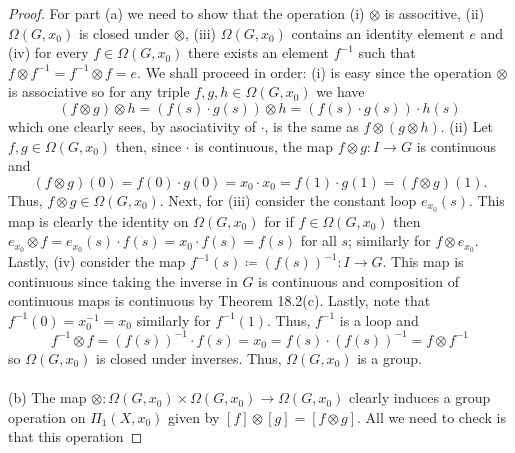 \begin{proof}
For part (a) we need to show that the operation (i) $\otimes$ is
associtive, (ii) $\Omega(G,x_0)$ is closed under $\otimes$, (iii)
$\Omega(G,x_0)$ contains an identity element $e$ and (iv) for every
$f\in\Omega(G,x_0)$ there exists an element $f^{-1}$ such that $f\otimes
f^{-1}=f^{-1}\otimes f=e$. We shall proceed in order: (i) is easy since
the operation $\otimes$ is associative so for any triple
$f,g,h\in\Omega(G,x_0)$ we have
\[
(f\otimes g)\otimes h=(f(s)\cdot g(s))\otimes h=(f(s)\cdot g(s))\cdot h(s)
\]
which one clearly sees, by asociativity of $\cdot$, is the same as
$f\otimes(g\otimes h)$. (ii) Let $f,g\in\Omega(G,x_0)$ then, since $\cdot$
is continuous, the map $f\otimes g\colon I\to G$ is continuous and
\[
(f\otimes g)(0)=f(0)\cdot g(0)=x_0\cdot x_0=f(1)\cdot g(1)
=(f\otimes g)(1).
\]
Thus, $f\otimes g\in\Omega(G,x_0)$. Next, for (iii) consider the constant
loop $e_{x_0}(s)$. This map is clearly the identity on $\Omega(G,x_0)$ for
if $f\in\Omega(G,x_0)$ then $e_{x_0}\otimes f=e_{x_0}(s)\cdot f(s)=x_0\cdot
f(s)=f(s)$ for all $s$; similarly for $f\otimes e_{x_0}$. Lastly, (iv)
consider the map $f^{-1}(s)\coloneqq (f(s))^{-1}\colon I\to G$. This map is
continuous since taking the inverse in $G$ is continuous and composition of
continuous maps is continuous by Theorem 18.2(c). Lastly, note that
$f^{-1}(0)=x_0^{-1}=x_0$ similarly for $f^{-1}(1)$. Thus, $f^{-1}$ is a
loop and
\[
f^{-1}\otimes f=(f(s))^{-1}\cdot f(s)=x_0=f(s)\cdot(f(s))^{-1}=f\otimes f^{-1}
\]
so $\Omega(G,x_0)$ is closed under inverses. Thus, $\Omega(G,x_0)$ is a group.
\\\\
(b) The map $\otimes\colon\Omega(G,x_0)\times\Omega(G,x_0)\to\Omega(G,x_0)$
clearly induces a group operation on $\Pi_1(X,x_0)$ given by
$[f]\otimes[g]=[f\otimes g]$. All we need to check is that this operation

\end{proof}

